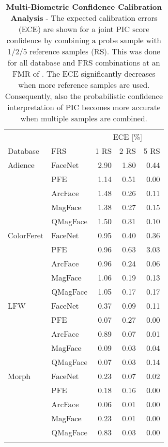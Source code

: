 \documentclass[10pt,twocolumn,letterpaper]{article}
\begin{document}
\begin{table}[ht]
\small
\renewcommand{\arraystretch}{1.0}
\setlength{\tabcolsep}{7pt}
\centering
\caption{\textbf{Multi-Biometric Confidence Calibration Analysis} - The expected calibration errors (ECE) are shown for a joint PIC score confidence by combining a probe sample with 1/2/5 reference samples (RS).
This was done for all database and FRS combinations at an FMR of .
The ECE significantly decreases when more reference samples are used. Consequently, also the probabilistic confidence interpretation of PIC becomes more accurate when multiple samples are combined.
}\label{tab:MultiCalibrationAnalysis}
\begin{tabular}{llrrr}
\Xhline{2\arrayrulewidth}
           &          & \multicolumn{3}{c}{ECE [\%]}     \\
           \cmidrule(rl){3-5}
Database   & FRS      & \multicolumn{1}{c}{1 RS}& \multicolumn{1}{c}{2 RS} & \multicolumn{1}{c}{5 RS}   \\
\hline
Adience    & FaceNet  &2.90&1.80 &0.44  \\
           & PFE      &1.14 & 0.51 &  0.00    \\
           & ArcFace  &1.48&0.26 &0.11\\
           & MagFace  &1.38&0.27&0.15\\
           & QMagFace &1.50&0.31&0.10\\
\hline
ColorFeret & FaceNet  &0.95& 0.40 &0.36\\
           & PFE     & 0.96 & 0.63 & 3.03    \\
           & ArcFace  &0.96& 0.24&0.06\\
           & MagFace &1.06&0.19&0.13\\
           & QMagFace &1.05&0.17&0.17\\
\hline
LFW        & FaceNet  &0.37& 0.09&0.11\\
           & PFE      & 0.07& 0.27 & 0.00 \\
           & ArcFace &0.89&0.07&0.01\\
           & MagFace &0.09&0.03&0.04\\
           & QMagFace &0.07&0.03&0.14    \\
\hline
Morph      & FaceNet  & 0.23&0.07  &0.02\\
           & PFE      &  0.18 & 0.16 & 0.00 \\
           & ArcFace &0.06&0.01  &0.00\\
           & MagFace  &0.23& 0.01 &0.00\\
           & QMagFace &0.83&0.03&0.00\\
\Xhline{2\arrayrulewidth}
\end{tabular}
\end{table}
\end{document}
